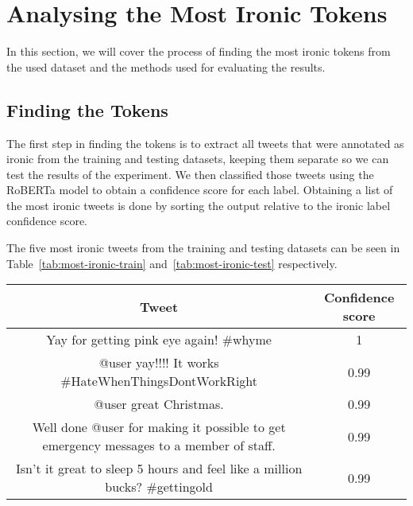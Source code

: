\documentclass[10pt, a4paper]{article}
\begin{document}
\section{Analysing the Most Ironic Tokens}

In this section, we will cover the process of finding the most ironic tokens from the used dataset and the methods used for evaluating the results.

\subsection{Finding the Tokens}

The first step in finding the tokens is to extract all tweets that were annotated as ironic from the training and testing datasets, keeping them separate so we can test the results of the experiment.
We then classified those tweets using the RoBERTa model to obtain a confidence score for each label.
Obtaining a list of the most ironic tweets is done by sorting the output relative to the ironic label confidence score.

The five most ironic tweets from the training and testing datasets can be seen in Table~\ref{tab:most-ironic-train} and~\ref{tab:most-ironic-test} respectively.

\begin{table*}
\caption{Most Ironic Tweets in the Training Set}
\label{tab:most-ironic-train}
\begin{center}
\begin{tabular}{c|c}
\toprule
Tweet & Confidence score\\
\midrule
Yay for getting pink eye again!  \#whyme                                                & 1 \\
@user yay!!!! It works  \#HateWhenThingsDontWorkRight                                   & 0.99 \\
@user great Christmas.                                                                  & 0.99 \\
Well done @user for making it possible to get emergency messages to a member of staff.  & 0.99 \\
Isn't it great to sleep 5 hours and feel like a million bucks?  \#gettingold            & 0.99 \\
\bottomrule
\end{tabular}
\end{center}
\end{table*}
\end{document}
